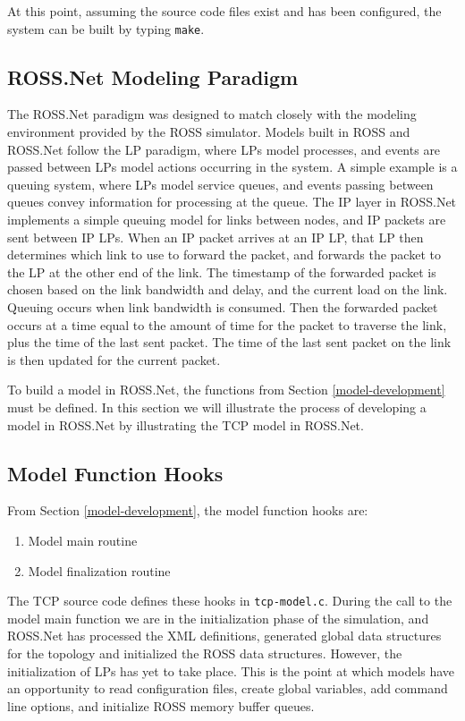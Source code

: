 \documentclass[12pt]{article}
\begin{document}
At this point, assuming the source code files exist and has been configured,
the system can be built by typing {\tt make}.

\subsection{ROSS.Net Modeling Paradigm}
\label{ex-model}

The ROSS.Net paradigm was designed to match closely with the modeling
environment provided by the ROSS simulator.  Models built in ROSS and ROSS.Net
follow the LP paradigm, where LPs model processes, and events are passed
between LPs model actions occurring in the system.  A simple example is a
queuing system, where LPs model service queues, and events passing between
queues convey information for processing at the queue.  The IP layer in
ROSS.Net implements a simple queuing model for links between nodes, and IP
packets are sent between IP LPs.  When an IP packet arrives at an IP LP, that
LP then determines which link to use to forward the packet, and forwards the
packet to the LP at the other end of the link.  The timestamp of the forwarded
packet is chosen based on the link bandwidth and delay, and the current load
on the link.  Queuing occurs when link bandwidth is consumed.  Then the
forwarded packet occurs at a time equal to the amount of time for the packet
to traverse the link, plus the time of the last sent packet.  The time of the
last sent packet on the link is then updated for the current packet.

To build a model in ROSS.Net, the functions from Section
\ref{model-development} must be defined.  In this section we will illustrate
the process of developing a model in ROSS.Net by illustrating the TCP model in
ROSS.Net.

\subsection{Model Function Hooks}

From Section \ref{model-development}, the model function hooks are:

\begin{enumerate}
  \item Model main routine
  \item Model finalization routine
\end{enumerate}

The TCP source code defines these hooks in {\tt tcp-model.c}.  During the call
to the model main function we are in the initialization phase of the
simulation, and ROSS.Net has processed the XML definitions, generated global
data structures for the topology and initialized the ROSS data structures.
However, the initialization of LPs has yet to take place.  This is the point
at which models have an opportunity to read configuration files, create global
variables, add command line options, and initialize ROSS memory buffer queues.
\end{document}
